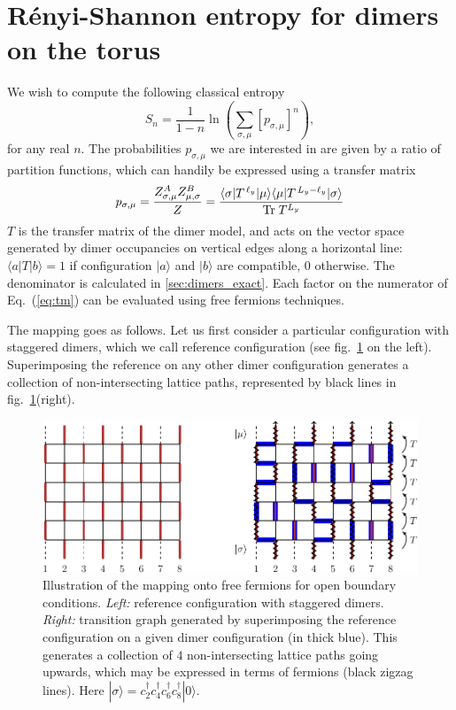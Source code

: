 \documentclass[11pt]{iopart}
\begin{document}
 \appendix
 \clearpage

\section[\;\;\;\;\;\;\;\;\;\;\;\;\;\;R\'enyi-Shannon entropy on the torus]{R\'enyi-Shannon entropy for dimers on the torus}
\label{sec:lgv}
We wish to compute the following classical entropy
\begin{equation}
 S_n=\frac{1}{1-n} \ln \left(\sum_{\sigma,\mu} [p_{\sigma,\mu}]^n\right), 
\end{equation}
for any real $n$. The probabilities $p_{\sigma,\mu}$ we are interested in are given by a ratio of partition functions, which can handily be expressed using a transfer matrix
\begin{equation}\label{eq:tm}
 p_{\sigma,\mu}=\frac{Z_{\sigma,\mu}^A Z_{\mu,\sigma}^B}{Z}=\frac{\langle  \sigma|T^{\,\ell_y}|\mu\rangle\langle \mu|T^{\,L_y-\ell_y}|\sigma\rangle}{{\rm Tr}\; T^{L_y}}
\end{equation}
$T$ is the transfer matrix of the dimer model, and acts on the vector space generated by dimer occupancies on vertical edges along a horizontal line: $\langle a|T|b\rangle=1$ if configuration $|a\rangle$ and $|b\rangle$ are compatible, $0$ otherwise. The denominator is calculated in \ref{sec:dimers_exact}. Each factor on the numerator of Eq.~(\ref{eq:tm}) can be evaluated using free fermions techniques\cite{Lieb1967,Alet_dimers2,Shannonee}. 

The mapping goes as follows. Let us first consider a particular configuration with staggered dimers, which we call reference configuration (see fig.~\ref{fig:freefermions} on the left). Superimposing the reference on any other dimer configuration generates a collection of non-intersecting lattice paths, represented by black lines in fig.~\ref{fig:freefermions}(right). 
\begin{figure}[ht]
\begin{center}
\includegraphics{./figures/free_fermions.pdf}
  \end{center}
  \caption{Illustration of the mapping onto free fermions for open boundary conditions. \emph{Left:} reference configuration with staggered dimers. \emph{Right:} transition graph generated by superimposing the reference configuration on a given dimer configuration (in thick blue). This generates a collection of $4$ non-intersecting lattice paths going upwards, which may be expressed in terms of fermions (black zigzag lines). Here $|\sigma\rangle=c_2^\dag c_4^\dag c_6^\dag c_8^\dag|0\rangle$.}
  \label{fig:freefermions}
  \end{figure}
\end{document}
